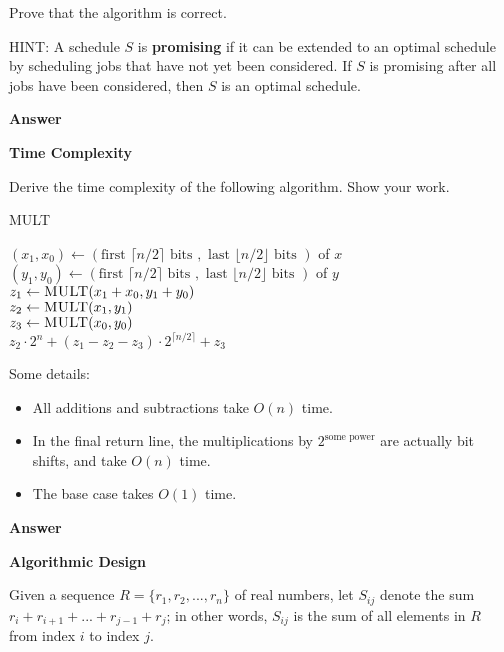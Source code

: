 \documentclass[12pt,twoside]{article}
\newcommand{\answer}{
 \par\medskip
 \textbf{Answer}
}
\newcommand{\answerI}{ \answer

}
\newcommand{\answerII}{ \answer

}
\begin{document}
\begin{problems}
Prove that the algorithm is correct.

HINT: A schedule $S$ is {\bf promising} if it can be extended to an optimal
schedule by scheduling jobs that have not yet been considered. If $S$ is
promising after all jobs have been considered, then $S$ is an optimal
schedule.

\answerI

\newpage

\problem {} \textbf{Time Complexity}

Derive the time complexity of the following algorithm. Show your work.

\begin{algorithm}[H]
  \caption{MULT}
  $(x_1, x_0) \leftarrow (\text{first } \lceil n/2 \rceil \text{ bits }, 
    \text{ last } \lfloor n/2 \rfloor \text{ bits })$ of $x$ \\
  $(y_1, y_0) \leftarrow (\text{first } \lceil n/2 \rceil \text{ bits }, 
    \text{ last } \lfloor n/2 \rfloor \text{ bits })$ of $y$ \\
  $z_1 \leftarrow \textsc{MULT}(x_1 + x_0, y_1 + y_0)$ \\
  $z_2 \leftarrow \textsc{MULT}(x_1, y_1)$ \\
  $z_3 \leftarrow \textsc{MULT}(x_0, y_0)$ \\
  \Return $z_2 \cdot 2^n + (z_1 - z_2 - z_3) \cdot 2^{\lceil n/2 \rceil}
     + z_3$ \\
\end{algorithm}

Some details:
\begin{itemize}
  \item All additions and subtractions take $O(n)$ time.
  \item In the final return line, the multiplications by $2^{\text{some power}}$
    are actually bit shifts, and take $O(n)$ time.
  \item The base case takes $O(1)$ time.
\end{itemize}

\answerII

\newpage

\problem {} \textbf{Algorithmic Design}

Given a sequence $R = \{r_1, r_2, ..., r_n\}$ of real numbers, let $S_{ij}$ denote
the sum $r_i + r_{i+1} + ... + r_{j-1} + r_j$; in other words, $S_{ij}$ is the sum
of all elements in $R$ from index $i$ to index $j$.


\end{problems}
\end{document}
